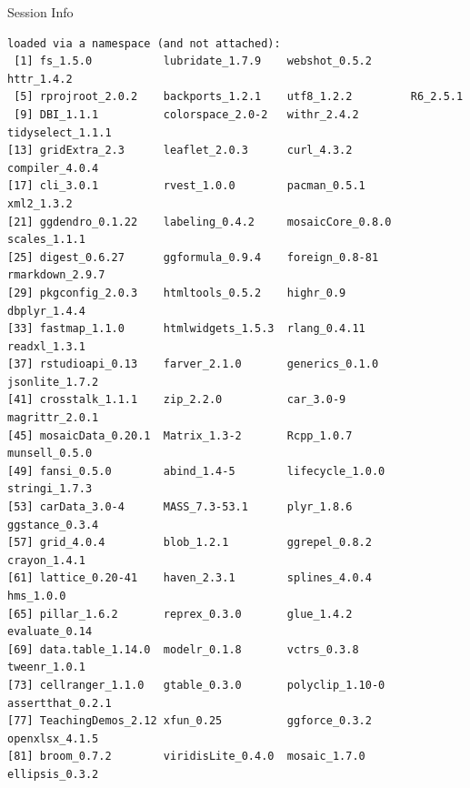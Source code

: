 \documentclass[10pt,handout]{beamer}\usepackage[]{graphicx}\usepackage[]{color}
\makeatletter
\newenvironment{kframe}{%
 \def\at@end@of@kframe{}%
 \ifinner\ifhmode%
  \def\at@end@of@kframe{\end{minipage}}%
  \begin{minipage}{\columnwidth}%
 \fi\fi%
 \def\FrameCommand##1{\hskip\@totalleftmargin \hskip-\fboxsep
 \colorbox{shadecolor}{##1}\hskip-\fboxsep
     \hskip-\linewidth \hskip-\@totalleftmargin \hskip\columnwidth}%
 \MakeFramed {\advance\hsize-\width
   \@totalleftmargin\z@ \linewidth\hsize
   \@setminipage}}%
 {\par\unskip\endMakeFramed%
 \at@end@of@kframe}
\newenvironment{knitrout}{}{} %
\makeatother
\begin{document}
\begin{frame}[fragile]{Session Info}
\begin{knitrout}
\begin{kframe}
\begin{verbatim}
loaded via a namespace (and not attached):
 [1] fs_1.5.0           lubridate_1.7.9    webshot_0.5.2      httr_1.4.2        
 [5] rprojroot_2.0.2    backports_1.2.1    utf8_1.2.2         R6_2.5.1          
 [9] DBI_1.1.1          colorspace_2.0-2   withr_2.4.2        tidyselect_1.1.1  
[13] gridExtra_2.3      leaflet_2.0.3      curl_4.3.2         compiler_4.0.4    
[17] cli_3.0.1          rvest_1.0.0        pacman_0.5.1       xml2_1.3.2        
[21] ggdendro_0.1.22    labeling_0.4.2     mosaicCore_0.8.0   scales_1.1.1      
[25] digest_0.6.27      ggformula_0.9.4    foreign_0.8-81     rmarkdown_2.9.7   
[29] pkgconfig_2.0.3    htmltools_0.5.2    highr_0.9          dbplyr_1.4.4      
[33] fastmap_1.1.0      htmlwidgets_1.5.3  rlang_0.4.11       readxl_1.3.1      
[37] rstudioapi_0.13    farver_2.1.0       generics_0.1.0     jsonlite_1.7.2    
[41] crosstalk_1.1.1    zip_2.2.0          car_3.0-9          magrittr_2.0.1    
[45] mosaicData_0.20.1  Matrix_1.3-2       Rcpp_1.0.7         munsell_0.5.0     
[49] fansi_0.5.0        abind_1.4-5        lifecycle_1.0.0    stringi_1.7.3     
[53] carData_3.0-4      MASS_7.3-53.1      plyr_1.8.6         ggstance_0.3.4    
[57] grid_4.0.4         blob_1.2.1         ggrepel_0.8.2      crayon_1.4.1      
[61] lattice_0.20-41    haven_2.3.1        splines_4.0.4      hms_1.0.0         
[65] pillar_1.6.2       reprex_0.3.0       glue_1.4.2         evaluate_0.14     
[69] data.table_1.14.0  modelr_0.1.8       vctrs_0.3.8        tweenr_1.0.1      
[73] cellranger_1.1.0   gtable_0.3.0       polyclip_1.10-0    assertthat_0.2.1  
[77] TeachingDemos_2.12 xfun_0.25          ggforce_0.3.2      openxlsx_4.1.5    
[81] broom_0.7.2        viridisLite_0.4.0  mosaic_1.7.0       ellipsis_0.3.2    
\end{verbatim}
\end{kframe}
\end{knitrout}
	
\end{frame}
\end{document}
